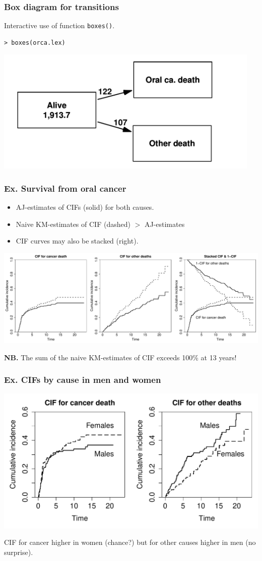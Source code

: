 \documentclass[handout,12pt,dvipsnames,t]{beamer}
\begin{document}
\begin{frame}[fragile]
\frametitle{Box diagram for transitions}

Interactive use of function {\tt boxes()}.
\small
\begin{verbatim}
> boxes(orca.lex)
\end{verbatim}
\begin{center}
\includegraphics[height=6cm]{orca-boxes}
\end{center}
\normalsize

\end{frame}

\begin{frame}[fragile]
\frametitle{Ex. Survival from oral cancer}
\begin{itemize}
\item
AJ-estimates of CIFs (solid) for both causes.
\item
Naive KM-estimates of CIF (dashed) $>$ AJ-estimates 
\item
CIF curves may also be stacked (right).  
\end{itemize}
\includegraphics[width=\textwidth]{orcaCI1}

\textbf{NB.} The sum of the naive KM-estimates of CIF exceeds 100\% at 13 years! 
\end{frame}

\begin{frame}[fragile]
\frametitle{Ex. CIFs by cause in men and women}

\includegraphics[width=\textwidth]{orcaCI2}

CIF for cancer higher in women (chance?) but for other causes
higher in men (no surprise).

\end{frame}
\end{document}
